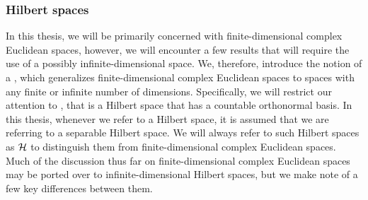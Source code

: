 \subsubsection*{Hilbert spaces}
In this thesis, we will be primarily concerned with finite-dimensional complex Euclidean spaces, however, we will encounter a few results that will require the use of a possibly infinite-dimensional space. We, therefore, introduce the notion of a , which generalizes finite-dimensional complex Euclidean spaces to spaces with any finite or infinite number of dimensions. Specifically, we will restrict our attention to , that is a Hilbert space that has a countable orthonormal basis. In this thesis, whenever we refer to a Hilbert space, it is assumed that we are referring to a separable Hilbert space. We will always refer to such Hilbert spaces as $\mathcal{H}$ to distinguish them from finite-dimensional complex Euclidean spaces. Much of the discussion thus far on finite-dimensional complex Euclidean spaces may be ported over to infinite-dimensional Hilbert spaces, but we make note of a few key differences between them. 

